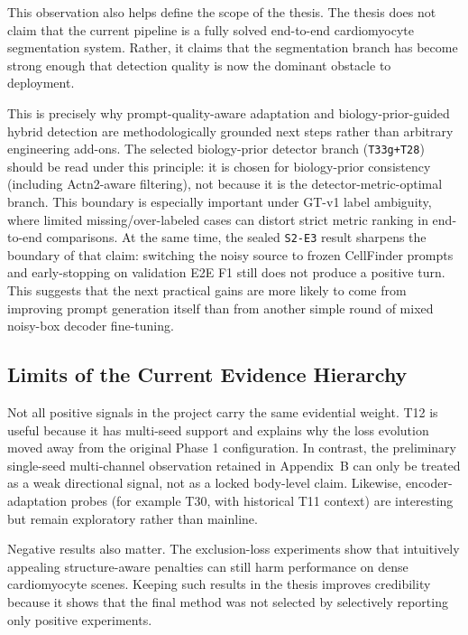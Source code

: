 This observation also helps define the scope of the thesis. The thesis does not claim that the current pipeline is a fully solved end-to-end cardiomyocyte segmentation system. Rather, it claims that the segmentation branch has become strong enough that detection quality is now the dominant obstacle to deployment.

This is precisely why prompt-quality-aware adaptation and biology-prior-guided hybrid detection are methodologically grounded next steps rather than arbitrary engineering add-ons. The selected biology-prior detector branch (\texttt{T33g+T28}) should be read under this principle: it is chosen for biology-prior consistency (including Actn2-aware filtering), not because it is the detector-metric-optimal branch. This boundary is especially important under GT-v1 label ambiguity, where limited missing/over-labeled cases can distort strict metric ranking in end-to-end comparisons. At the same time, the sealed \texttt{S2-E3} result sharpens the boundary of that claim: switching the noisy source to frozen CellFinder prompts and early-stopping on validation E2E F1 still does not produce a positive turn. This suggests that the next practical gains are more likely to come from improving prompt generation itself than from another simple round of mixed noisy-box decoder fine-tuning.

\subsection{Limits of the Current Evidence Hierarchy}\label{limits-of-the-current-evidence-hierarchy}

Not all positive signals in the project carry the same evidential weight. T12 is useful because it has multi-seed support and explains why the loss evolution moved away from the original Phase 1 configuration. In contrast, the preliminary single-seed multi-channel observation retained in Appendix~B can only be treated as a weak directional signal, not as a locked body-level claim. Likewise, encoder-adaptation probes (for example T30, with historical T11 context) are interesting but remain exploratory rather than mainline.

Negative results also matter. The exclusion-loss experiments show that intuitively appealing structure-aware penalties can still harm performance on dense cardiomyocyte scenes. Keeping such results in the thesis improves credibility because it shows that the final method was not selected by selectively reporting only positive experiments.

